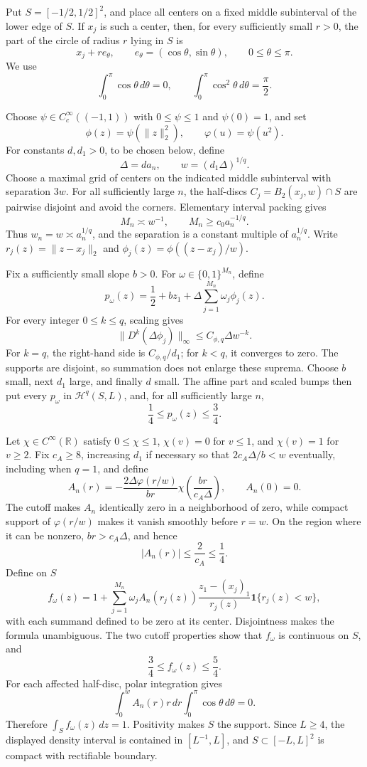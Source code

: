 Put \(S=[-1/2,1/2]^2\), and place all centers on a fixed middle subinterval of the lower edge of \(S\).  If \(x_j\) is such a center, then, for every sufficiently small \(r>0\), the part of the circle of radius \(r\) lying in \(S\) is
\[
 x_j+r e_\theta,
 \qquad e_\theta=(\cos\theta,\sin\theta),
 \qquad 0\leq\theta\leq\pi.
\]
We use
\[
 \int_0^\pi\cos\theta\,d\theta=0,
 \qquad
 \int_0^\pi\cos^2\theta\,d\theta=\frac\pi2.
\]

Choose \(\psi\in C_c^\infty((-1,1))\) with \(0\leq\psi\leq1\) and \(\psi(0)=1\), and set
\[
 \phi(z)=\psi(\lVert z\rVert_2^2),
 \qquad
 \varphi(u)=\psi(u^2).
\]
For constants \(d,d_1>0\), to be chosen below, define
\[
 \Delta=d a_n,
 \qquad
 w=(d_1\Delta)^{1/q}.
\]
Choose a maximal grid of centers on the indicated middle subinterval with separation \(3w\).  For all sufficiently large \(n\), the half-discs \(C_j=B_2(x_j,w)\cap S\) are pairwise disjoint and avoid the corners.  Elementary interval packing gives
\[
 M_n\asymp w^{-1},
 \qquad
 M_n\geq c_0a_n^{-1/q}.
\]
Thus \(w_n=w\asymp a_n^{1/q}\), and the separation is a constant multiple of \(a_n^{1/q}\).  Write \(r_j(z)=\lVert z-x_j\rVert_2\) and \(\phi_j(z)=\phi((z-x_j)/w)\).

Fix a sufficiently small slope \(b>0\).  For \(\omega\in\{0,1\}^{M_n}\), define
\[
 p_\omega(z)=\frac12+bz_1+\Delta\sum_{j=1}^{M_n}\omega_j\phi_j(z).
\]
For every integer \(0\leq k\leq q\), scaling gives
\[
 \lVert D^k(\Delta\phi_j)\rVert_\infty
 \leq C_{\phi,q}\Delta w^{-k}.
\]
For \(k=q\), the right-hand side is \(C_{\phi,q}/d_1\); for \(k<q\), it converges to zero.  The supports are disjoint, so summation does not enlarge these suprema.  Choose \(b\) small, next \(d_1\) large, and finally \(d\) small.  The affine part and scaled bumps then put every \(p_\omega\) in \(\mathcal H^q(S,L)\), and, for all sufficiently large \(n\),
\[
 \frac14\leq p_\omega(z)\leq\frac34.
\]

Let \(\chi\in C^\infty(\mathbb R)\) satisfy \(0\leq\chi\leq1\), \(\chi(v)=0\) for \(v\leq1\), and \(\chi(v)=1\) for \(v\geq2\).  Fix \(c_A\geq8\), increasing \(d_1\) if necessary so that \(2c_A\Delta/b<w\) eventually, including when \(q=1\), and define
\[
 A_n(r)=-\frac{2\Delta\varphi(r/w)}{br}
 \chi\!\left(\frac{br}{c_A\Delta}\right),
 \qquad A_n(0)=0.
\]
The cutoff makes \(A_n\) identically zero in a neighborhood of zero, while compact support of \(\varphi(r/w)\) makes it vanish smoothly before \(r=w\).  On the region where it can be nonzero, \(br>c_A\Delta\), and hence
\[
 |A_n(r)|\leq\frac{2}{c_A}\leq\frac14.
\]
Define on \(S\)
\[
 f_\omega(z)=1+
 \sum_{j=1}^{M_n}\omega_j A_n(r_j(z))
 \frac{z_1-(x_j)_1}{r_j(z)}\mathbf 1\{r_j(z)<w\},
\]
with each summand defined to be zero at its center.  Disjointness makes the formula unambiguous.  The two cutoff properties show that \(f_\omega\) is continuous on \(S\), and
\[
 \frac34\leq f_\omega(z)\leq\frac54.
\]
For each affected half-disc, polar integration gives
\[
 \int_0^w A_n(r)r\,dr\int_0^\pi\cos\theta\,d\theta=0.
\]
Therefore \(\int_S f_\omega(z)\,dz=1\).  Positivity makes \(S\) the support.  Since \(L\geq4\), the displayed density interval is contained in \([L^{-1},L]\), and \(S\subset[-L,L]^2\) is compact with rectifiable boundary.

